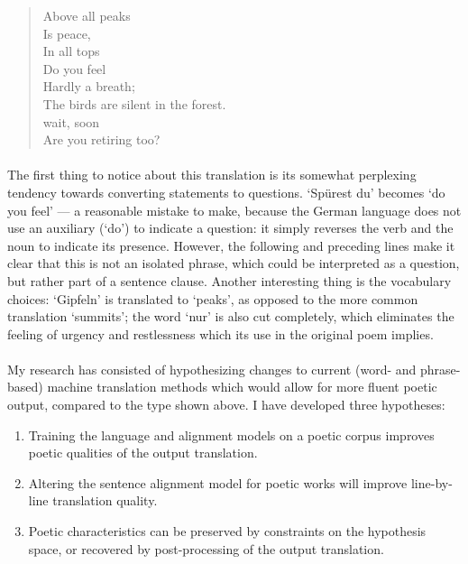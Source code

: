 \begin{minipage}{0.8\linewidth}
  \begin{verse}
    Above all peaks \\
    Is peace, \\
    In all tops \\
    Do you feel \\
    Hardly a breath; \\
    The birds are silent in the forest. \\
    wait, soon \\ 
    Are you retiring too? \\
  \end{verse}
\end{minipage}

\paragraph{}{The first thing to notice about this translation is its
  somewhat perplexing tendency towards converting statements to
  questions. `Sp{\"u}rest du' becomes `do you feel' --- a reasonable
  mistake to make, because the German language does not use an
  auxiliary (`do') to indicate a question: it simply reverses the verb
  and the noun to indicate its presence. However, the following and
  preceding lines make it clear that this is not an isolated phrase,
  which could be interpreted as a question, but rather part of a
  sentence clause. Another interesting thing is the vocabulary
  choices: `Gipfeln' is translated to `peaks', as opposed to the more
  common translation `summits'; the word `nur' is also cut completely,
  which eliminates the feeling of urgency and restlessness which its
  use in the original poem implies.}

\paragraph{}{My research has consisted of hypothesizing changes to
  current (word- and phrase-based) machine translation methods which
  would allow for more fluent poetic output, compared to the type
  shown above. I have developed three
  hypotheses:}
\begin{enumerate}
\item Training the language and alignment models on a poetic corpus
  improves poetic qualities of the output translation.
\item Altering the sentence alignment model for poetic works will
  improve line-by-line translation quality.
\item Poetic characteristics can be preserved by constraints on the
  hypothesis space, or recovered by post-processing of the output
  translation.
\end{enumerate}

